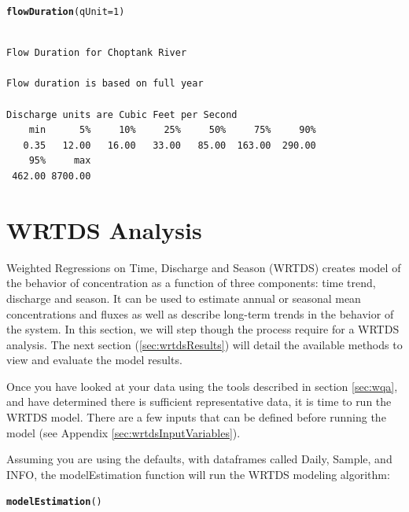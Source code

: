 \documentclass[a4paper,11pt]{article}\usepackage{graphicx, color}
\makeatletter
\newcommand{\hlfunctioncall}[1]{\textcolor[rgb]{0.501960784313725,0,0.329411764705882}{\textbf{#1}}}%
\newenvironment{kframe}{%
 \def\at@end@of@kframe{}%
 \ifinner\ifhmode%
  \def\at@end@of@kframe{\end{minipage}}%
  \begin{minipage}{\columnwidth}%
 \fi\fi%
 \def\FrameCommand##1{\hskip\@totalleftmargin \hskip-\fboxsep
 \colorbox{shadecolor}{##1}\hskip-\fboxsep
     \hskip-\linewidth \hskip-\@totalleftmargin \hskip\columnwidth}%
 \MakeFramed {\advance\hsize-\width
   \@totalleftmargin\z@ \linewidth\hsize
   \@setminipage}}%
 {\par\unskip\endMakeFramed%
 \at@end@of@kframe}
\newenvironment{knitrout}{}{} %
\makeatother
\begin{document}
\begin{knitrout}
\color{fgcolor}\begin{kframe}
\begin{alltt}
\hlfunctioncall{flowDuration}(qUnit=1)
\end{alltt}
\begin{verbatim}

Flow Duration for Choptank River 

Flow duration is based on full year

Discharge units are Cubic Feet per Second 
    min      5%     10%     25%     50%     75%     90% 
   0.35   12.00   16.00   33.00   85.00  163.00  290.00 
    95%     max 
 462.00 8700.00 
\end{verbatim}
\end{kframe}
\end{knitrout}


\FloatBarrier
\section{WRTDS Analysis}
\label{sec:wrtds}
Weighted Regressions on Time, Discharge and Season (WRTDS) creates model of the behavior of concentration as a function of three components: time trend, discharge and season.  It can be used to estimate annual or seasonal mean concentrations and fluxes as well as describe long-term trends in the behavior of the system. In this section, we will step though the process require for a WRTDS analysis. The next section (\ref{sec:wrtdsResults}) will detail the available methods to view and evaluate the model results. 

Once you have looked at your data using the tools described in section \ref{sec:wqa}, and have determined there is sufficient representative data, it is time to run the WRTDS model. There are a few inputs that can be defined before running the model (see Appendix \ref{sec:wrtdsInputVariables}).

Assuming you are using the defaults, with dataframes called Daily, Sample, and INFO, the modelEstimation function will run the WRTDS modeling algorithm:

\begin{knitrout}
\color{fgcolor}\begin{kframe}
\begin{alltt}
\hlfunctioncall{modelEstimation}()
\end{alltt}
\end{kframe}
\end{knitrout}
\end{document}
